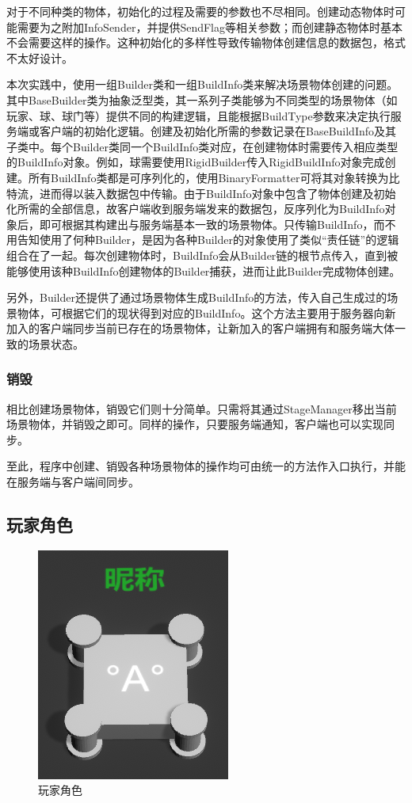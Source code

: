 \documentclass[conference]{IEEEtran}
\begin{document}
对于不同种类的物体，初始化的过程及需要的参数也不尽相同。创建动态物体时可能需要为之附加InfoSender，并提供SendFlag等相关参数；而创建静态物体时基本不会需要这样的操作。这种初始化的多样性导致传输物体创建信息的数据包，格式不太好设计。

本次实践中，使用一组Builder类和一组BuildInfo类来解决场景物体创建的问题。其中BaseBuilder类为抽象泛型类，其一系列子类能够为不同类型的场景物体（如玩家、球、球门等）提供不同的构建逻辑，且能根据BuildType参数来决定执行服务端或客户端的初始化逻辑。创建及初始化所需的参数记录在BaseBuildInfo及其子类中。每个Builder类同一个BuildInfo类对应，在创建物体时需要传入相应类型的BuildInfo对象。例如，球需要使用RigidBuilder传入RigidBuildInfo对象完成创建。所有BuildInfo类都是可序列化的，使用BinaryFormatter可将其对象转换为比特流，进而得以装入数据包中传输。由于BuildInfo对象中包含了物体创建及初始化所需的全部信息，故客户端收到服务端发来的数据包，反序列化为BuildInfo对象后，即可根据其构建出与服务端基本一致的场景物体。只传输BuildInfo，而不用告知使用了何种Builder，是因为各种Builder的对象使用了类似“责任链”的逻辑组合在了一起。每次创建物体时，BuildInfo会从Builder链的根节点传入，直到被能够使用该种BuildInfo创建物体的Builder捕获，进而让此Builder完成物体创建。

另外，Builder还提供了通过场景物体生成BuildInfo的方法，传入自己生成过的场景物体，可根据它们的现状得到对应的BuildInfo。这个方法主要用于服务器向新加入的客户端同步当前已存在的场景物体，让新加入的客户端拥有和服务端大体一致的场景状态。
\subsubsection{销毁}
\quad

相比创建场景物体，销毁它们则十分简单。只需将其通过StageManager移出当前场景物体，并销毁之即可。同样的操作，只要服务端通知，客户端也可以实现同步。

至此，程序中创建、销毁各种场景物体的操作均可由统一的方法作入口执行，并能在服务端与客户端间同步。

\subsection{玩家角色}
\begin{figure}[htbp]
  \centerline{\includegraphics[width=.15\textwidth]{images/player.png}}
  \caption{玩家角色}
  \label{fig:player}
\end{figure}
\end{document}
